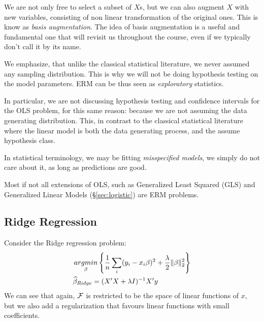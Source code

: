 We are not only free to select a subset of $X$s, but we can also augment $X$ with new variables, consisting of non linear transformation of the original ones. This is know as \emph{basis augmentation}. 
The idea of basis augmentation is a useful and fundamental one that will revisit us throughout the course, even if we typically don't call it by its name.

\begin{remark}
We emphasize, that unlike the classical statistical literature, we never assumed any sampling distribution. 
This is why we will not be doing hypothesis testing on the model parameters.
ERM can be thus seen as \emph{exploratory} statistics. 

In particular, we are not discussing hypothesis testing and confidence intervals for the OLS problem, for this same reason: because we are not assuming the data generating distribution. This, in contrast to the classical statistical literature where the linear model is both the data generating process, and the assume hypothesis class. 

In statistical terminology, we may be fitting \emph{misspecified models}, we simply do not care about it, as long as predictions are good. 
\end{remark}


\begin{remark}
Most if not all extensions of OLS, such as Generalized Least Squared (GLS) and Generalized Linear Models (\S\ref{sec:logistic}) are ERM problems. 
\end{remark}




\subsection{Ridge Regression}
\label{sec:ridge}

Consider the Ridge regression problem:
\begin{align}
\label{eq:ridge}
	& \mathop{argmin} _{\beta}\left\{ \frac{1}{n}\sum_i (y_i-x_i\beta)^2 + \frac{\lambda}{2}\Vert \beta \Vert_2^2 \right\} \\
	& \widehat{\beta}_{Ridge}= (X'X+\lambda I)^{-1} X'y
\end{align}
We can see that again, $\mathcal{F}$ is restricted to be the space of linear functions of $x$, but we also add a regularization that favours linear functions with small coefficients.

